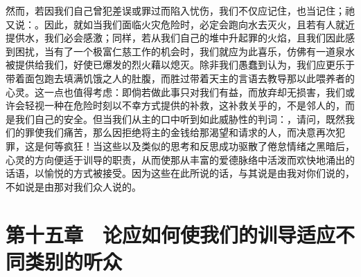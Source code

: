 然而，若因我们自己曾犯差误或罪过而陷入忧伤，我们不仅应记住，也当记住；祂又说：。因此，就如当我们面临火灾危险时，必定会跑向水去灭火，且若有人就近提供水，我们必会感激；同样，若从我们自己的堆中升起罪的火焰，且我们因此感到困扰，当有了一个极富仁慈工作的机会时，我们就应为此喜乐，仿佛有一道泉水被提供给我们，好使已爆发的烈火藉以熄灭。除非我们愚蠢到认为，我们应更乐于带着面包跑去填满饥饿之人的肚腹，而胜过带着天主的言语去教导那以此喂养者的心灵。这一点也值得考虑：即倘若做此事只对我们有益，而放弃却无损害，我们或许会轻视一种在危险时刻以不幸方式提供的补救，这补救关乎的，不是邻人的，而是我们自己的安全。但当我们从主的口中听到如此威胁性的判词：，请问，既然我们的罪使我们痛苦，那么因拒绝将主的金钱给那渴望和请求的人，而决意再次犯罪，这是何等疯狂！当这些以及类似的思考和反思成功驱散了倦怠情绪之黑暗后，心灵的方向便适于训导的职责，从而使那从丰富的爱德脉络中活泼而欢快地涌出的话语，以愉悦的方式被接受。因为这些在此所说的话，与其说是由我对你们说的，不如说是由那对我们众人说的。\par


\section{第十五章　论应如何使我们的训导适应不同类别的听众}

